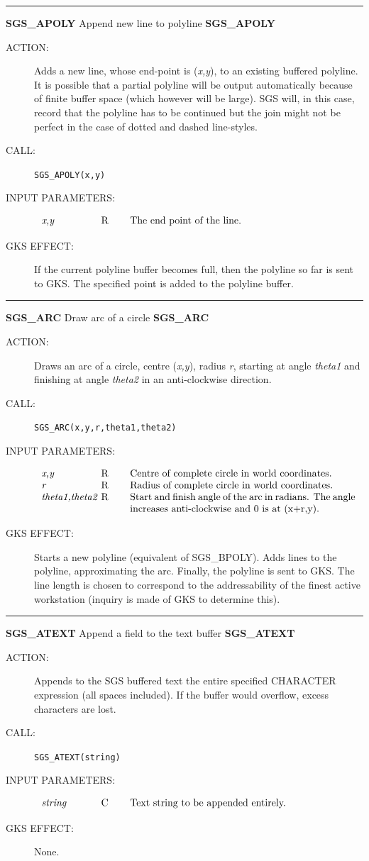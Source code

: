 \documentclass[11pt]{article}
\newcommand{\xlabel}[1]{}
\newcommand{\rthead}[2]{\rule{\textwidth}{0.3mm}
{\Large {\bf #1} \hfill #2 \hfill {\bf #1}}}
\newenvironment{params}%
{\[\begin{tabular}{p{0.14\textwidth}p{0.05\textwidth}p{0.66\textwidth}}}%
{\end{tabular}\]}
\newcommand{\rparams}[3]{{\em #1} &#2 &#3\\}
\newcommand{\rthead}[2]{\subsection{\label{#1}\xlabel{#1}#1 - #2}}
\newenvironment{params}{\begin{description}}{\end{description}}
\newcommand{\rparams}[3]{\item{{\em #1}} (#2) #3}
\begin{document}
\rthead{SGS\_APOLY}{Append new line to polyline}
\begin{description}
\item [ACTION:]
Adds a new line, whose end-point is ({\em x,y}), to an existing buffered
polyline.
It is possible that a partial polyline will be output automatically because of
finite buffer space (which however will be large).
SGS will, in this case, record that the polyline has to be continued but the
join might not be perfect in the case of dotted and dashed line-styles.
\item [CALL:]
{\tt SGS\_APOLY(x,y)}
\item [INPUT PARAMETERS:]
\begin{params}
\rparams{x,y}{R}{The end point of the line.}
\end{params}
\item [GKS EFFECT:]
If the current polyline buffer becomes full, then the polyline so far is sent to
GKS.
The specified point is added to the polyline buffer.
\end{description}
\goodbreak

\rthead{SGS\_ARC}{Draw arc of a circle}
\begin{description}
\item [ACTION:]
Draws an arc of a circle, centre ({\em x,y}), radius {\em r}, starting at
angle {\em theta1}\/ and finishing at angle {\em theta2}\/ in an anti-clockwise
direction.
\item [CALL:]
{\tt SGS\_ARC(x,y,r,theta1,theta2)}
\item [INPUT PARAMETERS:]
\begin{params}
\rparams{x,y}{R}{Centre of complete circle in world coordinates.}
\rparams{r}{R}{Radius of complete circle in world coordinates.}
\rparams{theta1,theta2}{R}{Start and finish angle of the arc in radians.
The angle increases anti-clockwise and 0 is at (x+r,y).}
\end{params}
\item [GKS EFFECT:]
Starts a new polyline (equivalent of SGS\_BPOLY).
Adds lines to the polyline, approximating the arc.
Finally, the polyline is sent to GKS.
The line length is chosen to correspond to the addressability of the finest
active workstation (inquiry is made of GKS to determine this).
\end{description}
\goodbreak

\rthead{SGS\_ATEXT}{Append a field to the text buffer}
\begin{description}
\item [ACTION:]
Appends to the SGS buffered text the entire specified CHARACTER expression (all
spaces included).
If the buffer would overflow, excess characters are lost.
\item [CALL:]
{\tt SGS\_ATEXT(string)}
\item [INPUT PARAMETERS:]
\begin{params}
\rparams{string}{C}{Text string to be appended entirely.}
\end{params}
\item [GKS EFFECT:]
None.
\end{description}
\goodbreak
\end{document}
